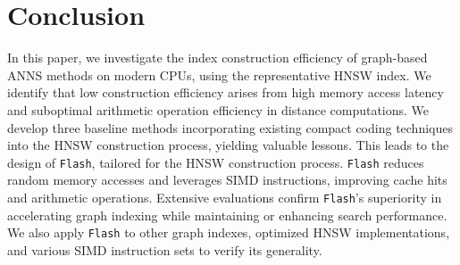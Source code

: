 \section{Conclusion}
\label{sec: conclusion}
In this paper, we investigate the index construction efficiency of graph-based ANNS methods on modern CPUs, using the representative HNSW index. We identify that low construction efficiency arises from high memory access latency and suboptimal arithmetic operation efficiency in distance computations. We develop three baseline methods incorporating existing compact coding techniques into the HNSW construction process, yielding valuable lessons. This leads to the design of \texttt{Flash}, tailored for the HNSW construction process. \texttt{Flash} reduces random memory accesses and leverages SIMD instructions, improving cache hits and arithmetic operations. Extensive evaluations confirm \texttt{Flash}'s superiority in accelerating graph indexing while maintaining or enhancing search performance. {We also apply \texttt{Flash} to other graph indexes, optimized HNSW implementations, and various SIMD instruction sets to verify its generality.}
